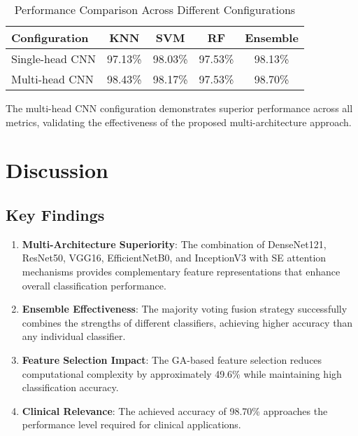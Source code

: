 \documentclass[journal]{IEEEtran}
\begin{document}
\begin{table}[!t]
\centering
\caption{Performance Comparison Across Different Configurations}
\label{tab:comparison}
\begin{tabular}{@{}lcccc@{}}
\toprule
\textbf{Configuration} & \textbf{KNN} & \textbf{SVM} & \textbf{RF} & \textbf{Ensemble} \\
\midrule
Single-head CNN & 97.13\% & 98.03\% & 97.53\% & 98.13\% \\
Multi-head CNN & 98.43\% & 98.17\% & 97.53\% & 98.70\% \\
\bottomrule
\end{tabular}
\end{table}

The multi-head CNN configuration demonstrates superior performance across all metrics, validating the effectiveness of the proposed multi-architecture approach.

\section{Discussion}

\subsection{Key Findings}

\begin{enumerate}
    \item \textbf{Multi-Architecture Superiority}: The combination of DenseNet121, ResNet50, VGG16, EfficientNetB0, and InceptionV3 with SE attention mechanisms provides complementary feature representations that enhance overall classification performance.
    
    \item \textbf{Ensemble Effectiveness}: The majority voting fusion strategy successfully combines the strengths of different classifiers, achieving higher accuracy than any individual classifier.
    
    \item \textbf{Feature Selection Impact}: The GA-based feature selection reduces computational complexity by approximately 49.6\% while maintaining high classification accuracy.
    
    \item \textbf{Clinical Relevance}: The achieved accuracy of 98.70\% approaches the performance level required for clinical applications.
\end{enumerate}
\end{document}
